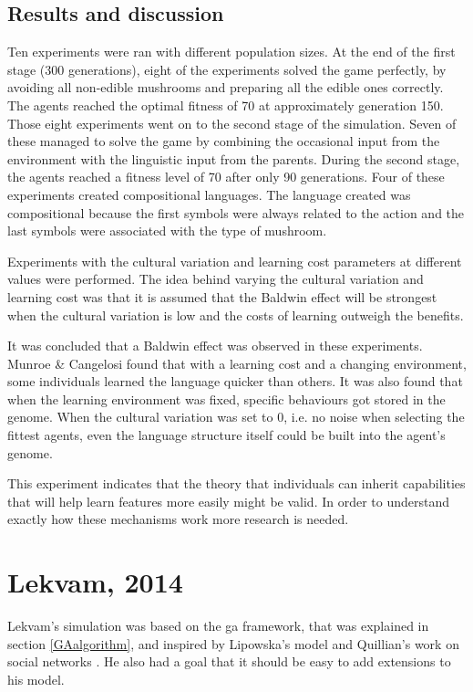 \subsection{Results and discussion}
Ten experiments were ran with different population sizes. At the end of the first stage (300 generations), eight of the experiments solved the game perfectly, by avoiding all non-edible mushrooms and preparing all the edible ones correctly. The agents reached the optimal fitness of 70 at approximately generation 150.
Those eight experiments went on to the second stage of the simulation. Seven of these managed to solve the game by combining the occasional input from the environment with the linguistic input from the parents. During the second stage, the agents reached a fitness level of 70 after only 90 generations. 
Four of these experiments created compositional languages. The language created was compositional because the first symbols were always related to the action and the last symbols were associated with the type of mushroom.

Experiments with the cultural variation and learning cost parameters at different values were performed. The idea behind varying the cultural variation and learning cost was that it is assumed that the Baldwin effect will be strongest when the cultural variation is low and the costs of learning outweigh the benefits.

It was concluded that a Baldwin effect was observed in these experiments. Munroe \& Cangelosi found that with a learning cost and a changing environment, some individuals learned the language quicker than others. It was also found that when the learning environment was fixed, specific behaviours got stored in the genome. When the cultural variation was set to 0, i.e. no noise when selecting the fittest agents, even the language structure itself could be built into the agent's genome.

This experiment indicates that the theory that individuals can inherit capabilities that will help learn features more easily might be valid. In order to understand exactly how these mechanisms work more research is needed.

\section{Lekvam, 2014}
Lekvam's simulation \citep{lekvam2014co} was based on the \ac{ga} framework, that was explained in section \ref{GAalgorithm}, and inspired by Lipowska's model \citep{lipowska2011naming} and Quillian's work on social networks \citep{quillinan2006social}. He also had a goal that it should be easy to add extensions to his model.

